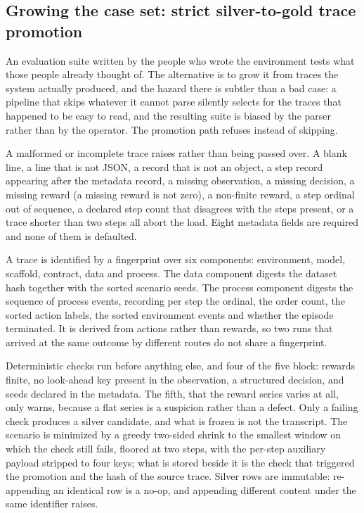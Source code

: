 \subsection{Growing the case set: strict silver-to-gold trace promotion}\label{sec:trace-promotion}

An evaluation suite written by the people who wrote the environment tests what those people already thought of. The alternative is to grow it from traces the system actually produced, and the hazard there is subtler than a bad case: a pipeline that skips whatever it cannot parse silently selects for the traces that happened to be easy to read, and the resulting suite is biased by the parser rather than by the operator. The promotion path refuses instead of skipping.

A malformed or incomplete trace raises rather than being passed over. A blank line, a line that is not JSON, a record that is not an object, a step record appearing after the metadata record, a missing observation, a missing decision, a missing reward (a missing reward is not zero), a non-finite reward, a step ordinal out of sequence, a declared step count that disagrees with the steps present, or a trace shorter than two steps all abort the load. Eight metadata fields are required and none of them is defaulted.

A trace is identified by a fingerprint over six components: environment, model, scaffold, contract, data and process. The data component digests the dataset hash together with the sorted scenario seeds. The process component digests the sequence of process events, recording per step the ordinal, the order count, the sorted action labels, the sorted environment events and whether the episode terminated. It is derived from actions rather than rewards, so two runs that arrived at the same outcome by different routes do not share a fingerprint.

Deterministic checks run before anything else, and four of the five block: rewards finite, no look-ahead key present in the observation, a structured decision, and seeds declared in the metadata. The fifth, that the reward series varies at all, only warns, because a flat series is a suspicion rather than a defect. Only a failing check produces a silver candidate, and what is frozen is not the transcript. The scenario is minimized by a greedy two-sided shrink to the smallest window on which the check still fails, floored at two steps, with the per-step auxiliary payload stripped to four keys; what is stored beside it is the check that triggered the promotion and the hash of the source trace. Silver rows are immutable: re-appending an identical row is a no-op, and appending different content under the same identifier raises.

